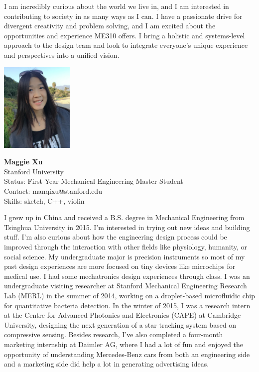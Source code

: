 I am incredibly curious about the world we live in, and I am interested in contributing to society in as many ways as I can.  I have a passionate drive for divergent creativity and problem solving, and I am excited about the opportunities and  experience ME310 offers. I bring a holistic and systems-level approach to the design team and look to integrate everyone's unique experience and perspectives into a unified vision.


\vspace{2em}
\noindent \includegraphics[width=35mm]{Figures/People/Maggie_Xu.png}
\hspace{0.5em}\parbox[b]{0.6\textwidth}{\textbf{Maggie Xu}\\
Stanford University\\
Status: First Year Mechanical Engineering Master Student\\
Contact: manqixu@stanford.edu\\
Skills: sketch, C++, violin\\
}

I grew up in China and received a B.S. degree in Mechanical Engineering from Tsinghua University in 2015. I'm interested in trying out new ideas and building stuff. I'm also curious about how the engineering design process could be improved through the interaction with other fields like physiology, humanity, or social science. My undergraduate major is precision instruments so most of my past design experiences are more focused on tiny devices like microchips for medical use. I had some mechatronics design experiences through class. I was an undergraduate visiting researcher at Stanford Mechanical Engineering Research Lab (MERL) in the summer of 2014, working on a droplet-based microfluidic chip for quantitative bacteria detection. In the winter of 2015, I was a research intern at the Centre for Advanced Photonics and Electronics (CAPE) at Cambridge University, designing the next generation of a star tracking system based on compressive sensing. Besides research, I've also completed a four-month marketing internship at Daimler AG, where I had a lot of fun and enjoyed the opportunity of understanding Mercedes-Benz cars from both an engineering side and a marketing side did help a lot in generating advertising ideas.

